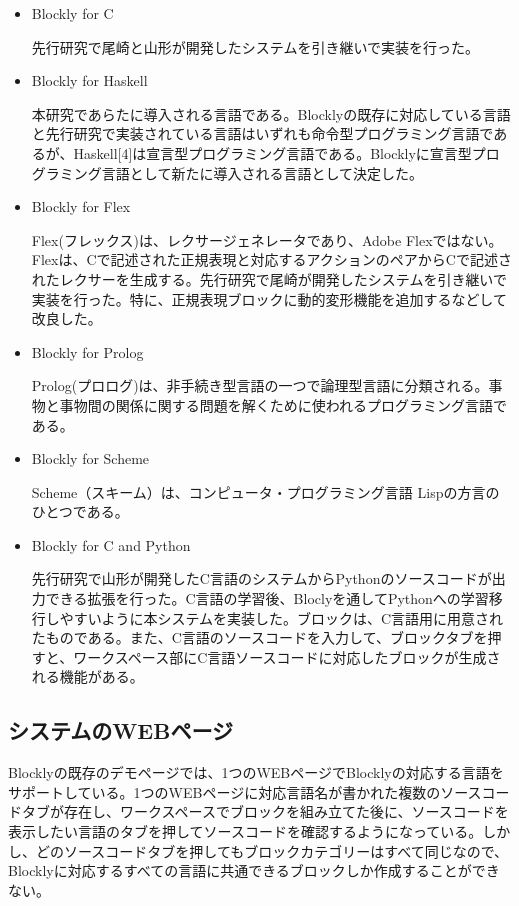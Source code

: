 \documentclass{risepaper}
\begin{document}
\begin{itemize}
\item Blockly for C

先行研究で尾崎と山形が開発したシステムを引き継いで実装を行った。

\item Blockly for Haskell

本研究であらたに導入される言語である。Blocklyの既存に対応している言語と先行研究で実装されている言語はいずれも命令型プログラミング言語であるが、Haskell[4]は宣言型プログラミング言語である。Blocklyに宣言型プログラミング言語として新たに導入される言語として決定した。

\item Blockly for Flex

Flex\cite{flex}(フレックス)は、レクサージェネレータであり、Adobe Flex\texttrademark ではない。Flexは、Cで記述された正規表現と対応するアクションのペアからCで記述されたレクサーを生成する。先行研究で尾崎が開発したシステムを引き継いで実装を行った。特に、正規表現ブロックに動的変形機能を追加するなどして改良した。

\item Blockly for Prolog

Prolog(プロログ)\cite{prolog}は、非手続き型言語の一つで論理型言語に分類される。事物と事物間の関係に関する問題を解くために使われるプログラミング言語である。

\item Blockly for Scheme

Scheme（スキーム）は、コンピュータ・プログラミング言語 Lispの方言のひとつである。

\item Blockly for C and Python

先行研究で山形が開発したC言語のシステムからPythonのソースコードが出力できる拡張を行った。C言語の学習後、Bloclyを通してPythonへの学習移行しやすいように本システムを実装した。ブロックは、C言語用に用意されたものである。また、C言語のソースコードを入力して、ブロックタブを押すと、ワークスペース部にC言語ソースコードに対応したブロックが生成される機能がある。

\end{itemize} 
   
   \subsection{システムのWEBページ}
   
Blocklyの既存のデモページでは、1つのWEBページでBlocklyの対応する言語をサポートしている。1つのWEBページに対応言語名が書かれた複数のソースコードタブが存在し、ワークスペースでブロックを組み立てた後に、ソースコードを表示したい言語のタブを押してソースコードを確認するようになっている。しかし、どのソースコードタブを押してもブロックカテゴリーはすべて同じなので、Blocklyに対応するすべての言語に共通できるブロックしか作成することができない。
\end{document}

